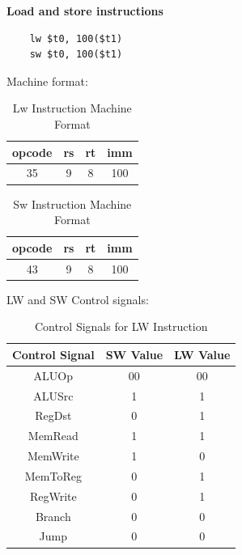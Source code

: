 \textbf{Load and store instructions}\newline
\begin{verbatim}
    lw $t0, 100($t1)
    sw $t0, 100($t1)
\end{verbatim}

Machine format:
\begin{table}[H]
    \centering
    \begin{tabular}{|c|c|c|c|}
    \hline
    \textbf{opcode} & \textbf{rs} & \textbf{rt} & \textbf{imm} \\ \hline
    35             & 9          & 8          & 100          \\ \hline
    \end{tabular}
    \caption{Lw Instruction Machine Format}
    \label{tab:lw_instruction}

\end{table}

\begin{table}[H]
    \centering
    \begin{tabular}{|c|c|c|c|}
    \hline
    \textbf{opcode} & \textbf{rs} & \textbf{rt} & \textbf{imm} \\ \hline
    43             & 9          & 8          & 100          \\ \hline
    \end{tabular}
    \caption{Sw Instruction Machine Format}
    \label{tab:sw_instruction}

\end{table}


LW and SW Control signals:
\begin{table}[H]
    \centering
    \begin{tabular}{|c|c|c|}
    \hline
    \textbf{Control Signal} & \textbf{SW Value} & \textbf{LW Value} \\ \hline
    ALUOp                   & 00               & 00               \\ \hline
    ALUSrc                  & 1                & 1                \\ \hline
    RegDst                  & 0                & 1                \\ \hline
    MemRead                 & 1                & 1                \\ \hline
    MemWrite                & 1                & 0                \\ \hline
    MemToReg                & 0                & 1                \\ \hline
    RegWrite                & 0                & 1                \\ \hline
    Branch                  & 0                & 0                \\ \hline
    Jump                 & 0                & 0                \\ \hline
    \end{tabular}
    \caption{Control Signals for LW Instruction}
    \label{tab:lw_control_signals}
\end{table}

